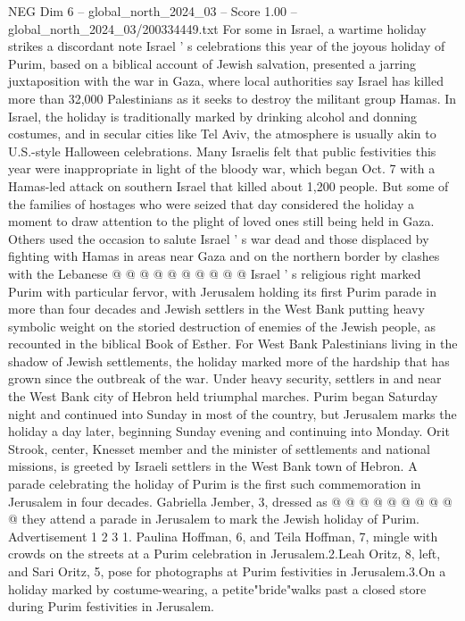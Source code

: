 \begin{textsample}{NEG Dim 6 – global\_north\_2024\_03 – Score 1.00 – global\_north\_2024\_03/200334449.txt}  \label{ex:f6_neg_406}
For some in Israel, a wartime holiday strikes a discordant note Israel ' s celebrations this year of the joyous holiday of Purim, based on a biblical account of Jewish salvation, presented a jarring juxtaposition with the war in Gaza, where local authorities say Israel has killed more than 32,000 Palestinians as it seeks to destroy the militant group Hamas.
In Israel, the holiday is traditionally marked by drinking alcohol and donning costumes, and in secular cities like Tel Aviv, the atmosphere is usually akin to U.S.-style Halloween celebrations.
Many Israelis felt that public festivities this year were inappropriate in light of the bloody war, which began Oct. 7 with a Hamas-led attack on southern Israel that killed about 1,200 people.
But some of the families of hostages who were seized that day considered the holiday a moment to draw attention to the plight of loved ones still being held in Gaza.
Others used the occasion to salute Israel ' s war dead and those displaced by fighting with Hamas in areas near Gaza and on the northern border by clashes with the Lebanese @ @ @ @ @ @ @ @ @ @ Israel ' s religious right marked Purim with particular fervor, with Jerusalem holding its first Purim parade in more than four decades and Jewish settlers in the West Bank putting heavy symbolic weight on the storied destruction of enemies of the Jewish people, as recounted in the biblical Book of Esther.
For West Bank Palestinians living in the shadow of Jewish settlements, the holiday marked more of the hardship that has grown since the outbreak of the war.
Under heavy security, settlers in and near the West Bank city of Hebron held triumphal marches.
Purim began Saturday night and continued into Sunday in most of the country, but Jerusalem marks the holiday a day later, beginning Sunday evening and continuing into Monday.
Orit Strook, center, Knesset member and the minister of settlements and national missions, is greeted by Israeli settlers in the West Bank town of Hebron.
A parade celebrating the holiday of Purim is the first such commemoration in Jerusalem in four decades.
Gabriella Jember, 3, dressed as @ @ @ @ @ @ @ @ @ @ they attend a parade in Jerusalem to mark the Jewish holiday of Purim.
Advertisement 1 2 3 1.
Paulina Hoffman, 6, and Teila Hoffman, 7, mingle with crowds on the streets at a Purim celebration in Jerusalem.2.Leah Oritz, 8, left, and Sari Oritz, 5, pose for photographs at Purim festivities in Jerusalem.3.On a holiday marked by costume-wearing, a petite"bride"walks past a closed store during Purim festivities in Jerusalem.

\end{textsample}
